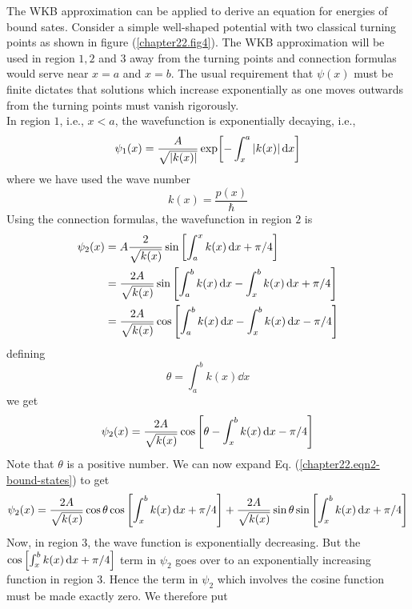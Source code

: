 The WKB approximation can be applied to derive an equation for energies of bound sates. Consider a simple well-shaped potential with two classical turning points as shown in figure (\ref{chapter22.fig4}). The WKB approximation will be used in region $1,2$ and $3$ away from the turning points and connection formulas would serve near $x=a$ and $x=b$. The usual requirement that $\psi(x)$ must be finite dictates that solutions which increase exponentially as one moves outwards from the turning points must vanish rigorously.\\

In region $1$, i.e., $x<a$, the wavefunction is exponentially decaying, i.e., 
\begin{equation}
	\psi_1(x) = \frac{A}{\sqrt{\abs{k(x)}}} \exp[-\int_{x}^{a} \abs{k(x)} 
	\dd{x}]
	\label{chapter22.eqn1-bound-states}
\end{equation}
where we have used the wave number 
\begin{equation}
	k(x) = \frac{p(x)}{\hbar}
\end{equation}
Using the connection formulas, the wavefunction in region $2$ is
\begin{align*}
\psi_2(x) 
&= A \frac{2}{\sqrt{k(x)}} \sin \qty[\int_{a}^{x} k(x) \dd{x} + \pi/4] \\
&= \frac{2 A}{\sqrt{k(x)}} \sin \qty[\int_{a}^{b}k(x) \dd{x} - \int_{x}^{b} k(x) \dd{x}+ \pi/4 ] \\
&= \frac{2 A}{\sqrt{k(x)}} \cos \qty[\int_{a}^{b}k(x) \dd{x} - \int_{x}^{b} k(x) \dd{x} - \pi/4 ] 
\end{align*}
defining
\begin{equation}
	\theta = \int_{a}^{b}k(x) \dd{x}
\end{equation}
we get
\begin{equation}
\label{chapter22.eqn2-bound-states}
	\psi_2(x) = \frac{2 A}{\sqrt{k(x)}} \cos \qty[\theta - \int_{x}^{b} k(x) \dd{x} - \pi/4 ]
\end{equation}
Note that $\theta$ is a positive number. We can now expand Eq. (\ref{chapter22.eqn2-bound-states}) to get
\begin{equation}
\label{chapter22.eqn3-bound-states}
	\psi_2(x) = \frac{2 A}{\sqrt{k(x)}} \cos \theta \cos \qty[\int_{x}^{b} k(x) \dd{x} + \pi/4 ] +
	 \frac{2 A}{\sqrt{k(x)}} \sin\theta \sin \qty[\int_{x}^{b} k(x) \dd{x} + \pi/4 ]
\end{equation}
Now, in region $3$, the wave function is exponentially decreasing. But the $\cos \qty[\int_{x}^{b} k(x) \dd{x} + \pi/4 ]$ term in $\psi_2$ goes over to an exponentially increasing function in region $3$. Hence the term in $\psi_2$ which involves the cosine function must be made exactly zero. We therefore put
